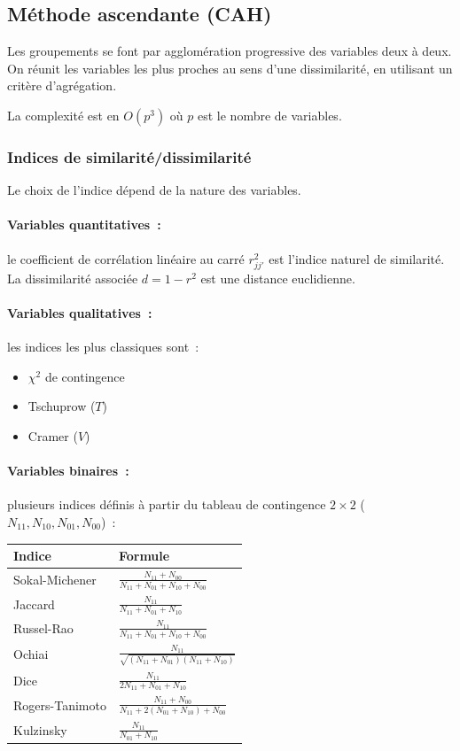 \documentclass[a4paper,11pt]{article}
\theoremstyle{definition}
\theoremstyle{remark}
\begin{document}
\subsection{M\'ethode ascendante (CAH)}

Les groupements se font par agglom\'eration progressive des variables
deux \`a deux. On r\'eunit les variables les plus proches au sens
d'une dissimilarit\'e, en utilisant un crit\`ere d'agr\'egation.

La complexit\'e est en $O(p^3)$ o\`u $p$ est le nombre de variables.

\subsubsection{Indices de similarit\'e/dissimilarit\'e}

Le choix de l'indice d\'epend de la nature des variables.

\paragraph*{Variables quantitatives~:}
le coefficient de corr\'elation lin\'eaire au carr\'e $r_{jj'}^2$
est l'indice naturel de similarit\'e. La dissimilarit\'e associ\'ee
$d = 1 - r^2$ est une distance euclidienne.

\paragraph*{Variables qualitatives~:}
les indices les plus classiques sont~:
\begin{itemize}
  \item $\chi^2$ de contingence
  \item Tschuprow ($T$)
  \item Cramer ($V$)
\end{itemize}

\paragraph*{Variables binaires~:}
plusieurs indices d\'efinis \`a partir du tableau de contingence
$2\times2$ ($N_{11}, N_{10}, N_{01}, N_{00}$)~:

\begin{tabular}{ll}
\toprule
Indice & Formule \\
\midrule
Sokal-Michener & $\displaystyle \frac{N_{11}+N_{00}}{N_{11}+N_{01}+N_{10}+N_{00}}$ \\
Jaccard & $\displaystyle \frac{N_{11}}{N_{11}+N_{01}+N_{10}}$ \\
Russel-Rao & $\displaystyle \frac{N_{11}}{N_{11}+N_{01}+N_{10}+N_{00}}$ \\
Ochiai & $\displaystyle \frac{N_{11}}{\sqrt{(N_{11}+N_{01})(N_{11}+N_{10})}}$ \\
Dice & $\displaystyle \frac{N_{11}}{2N_{11}+N_{01}+N_{10}}$ \\
Rogers-Tanimoto & $\displaystyle \frac{N_{11}+N_{00}}{N_{11}+2(N_{01}+N_{10})+N_{00}}$ \\
Kulzinsky & $\displaystyle \frac{N_{11}}{N_{01}+N_{10}}$ \\
\bottomrule
\end{tabular}
\end{document}
